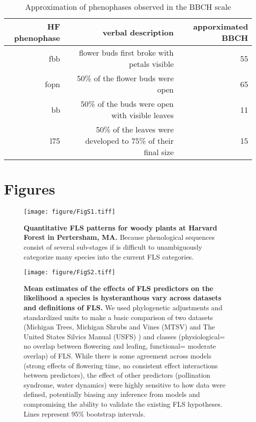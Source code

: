 \documentclass[11pt]{article}\usepackage[]{graphicx}\usepackage[]{color}
\begin{document}
\begin{table}[ht]
\centering
\begin{tabular}{rrr}
  \hline
  HF phenophase & verbal description & apporximated BBCH  \\ 
  \hline
  fbb & flower buds first broke with petals visible & 55 \\
  fopn &  50\% of the flower buds were open & 65 \\
 bb &  50\% of the buds were open with visible leaves & 11 \\
 l75 & 50\% of the leaves were developed to 75\% of their final size &  15 \\


   \hline
\end{tabular}
\caption{Approximation of phenophases observed in \citep{OKeefe2015} the BBCH scale \citep{Finn2007}} 
\label{BBCH2HF}
\end{table}


\pagebreak[4]

\section*{Figures}


\begin{figure}[H]
    \centering
 \texttt{[image: figure/FigS1.tiff]} 
    \caption{\textbf{Quantitative FLS patterns for woody plants at Harvard Forest in Pertersham, MA.} Because phenological sequences consist of several sub-stages if is difficult to unambiguously categorize many species into the current FLS categories. }
    \label{fig:HFmeans}
\end{figure}

\begin{figure}[H]
    \centering
 \texttt{[image: figure/FigS2.tiff]} 
    \caption{\textbf{Mean estimates of the effects of FLS predictors on the likelihood a species is hysteranthous vary across datasets and definitions of FLS.}  We used phylogenetic adjustments and standardized units to make a basic comparison of two datasets (Michigan Trees, Michigan Shrubs and Vines (MTSV) \citep{Barnes2004,Barnes2016} and The United States Silvics Manual (USFS) \citep{Burns1990}) and classes (physiological= no overlap between flowering and leafing, functional= moderate overlap) of FLS. While there is some agreement across models (strong effects of flowering time, no consistent effect interactions between predictors), the effect of other predictors (pollination syndrome, water dynamics) were highly sensitive to how data were defined, potentially biasing any inference from models and compromising the ability to validate the existing FLS hypotheses. Lines represent 95\% bootstrap intervals.}
    \label{fig:muplots.USMT}
\end{figure}
\end{document}

